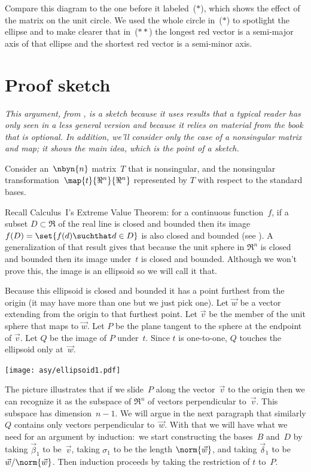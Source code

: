 Compare this diagram to the one before it 
labeled~($*$), which shows the effect of the matrix
on the unit circle.
We used the whole circle in~($*$) to spotlight the ellipse and 
to make clearer that in~($**$)
the longest red vector is a
semi-major axis of that ellipse and the shortest red vector is a 
semi-minor axis.



\section{Proof sketch}

\textit{This argument, 
from \cite{BlankKrikorianSpring89},
is a sketch because it uses results that a typical reader has only 
seen in a less general version and because it relies on material from the
book that is optional.
In addition, we'll consider only the case of a nonsingular matrix and map;
it shows the main idea, which is the point of a sketch.}

Consider an~$\nbyn{n}$ matrix~$T$ that is nonsingular, and the
nonsingular transformation~$\map{t}{\Re^n}{\Re^n}$ represented by
$T$ with respect to the standard bases.

Recall Calculus~I's Extreme Value Theorem: for a continuous
function~$f$, if a subset $D\subset \Re$ of the real line 
is closed and bounded then
its image $f(D)=\set{f(d)\suchthat d\in D}$ 
is also closed and bounded (see \cite{wiki:ExtremeValueThm}).
A generalization of that result gives that because the unit sphere in $\Re^n$
is closed and bounded then its image under~$t$ is closed and bounded.
Although we won't prove this, the image is an ellipsoid
so we will call it that. 

Because this ellipsoid is closed and bounded it has a 
point furthest from the origin (it may have more than one but we just pick one).
Let $\vec{w}$ be a vector extending from the origin to that furthest point.
Let $\vec{v}$ be the member of the unit sphere that maps to $\vec{w}$.
Let $P$ be the plane tangent to the sphere at the endpoint of $\vec{v}$.
Let $Q$ be the image of $P$ under~$t$.
Since $t$ is one-to-one, $Q$ touches the ellipsoid only at~$\vec{w}$.
\begin{center}
  \texttt{[image: asy/ellipsoid1.pdf]}
\end{center}

The picture illustrates that if we slide~$P$ along the 
vector~$\vec{v}$ to
the origin then we can recognize it as 
the subspace of $\Re^n$ of vectors perpendicular
to~$\vec{v}$.
This subspace has dimension~$n-1$. 
We will argue in the next paragraph 
that similarly $Q$ contains only
vectors perpendicular to~$\vec{w}$.
With that we will have what we need for an argument by induction:~we 
start constructing the 
bases~$B$ and~$D$ by taking $\vec{\beta}_1$ to be~$\vec{v}$, taking
$\sigma_1$ to be the length $\norm{\vec{w}}$, and taking
$\vec{\delta}_1$ to be $\vec{w}/\norm{\vec{w}}$.
Then induction proceeds by taking the restriction of $t$ to~$P$.

